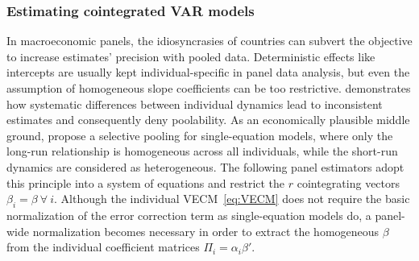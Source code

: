 \subsubsection{Estimating cointegrated VAR models}
In macroeconomic panels, the idiosyncrasies of countries can subvert the objective to increase estimates' precision with pooled data. Deterministic effects like intercepts are usually kept individual-specific in panel data analysis, but even the assumption of homogeneous slope coefficients can be too restrictive. \citet{PesaranSmith1995} demonstrates how systematic differences between individual dynamics lead to inconsistent estimates and consequently deny poolability. As an economically plausible middle ground, \citet{PesaranEtAl1999} propose a selective pooling for single-equation models, where only the long-run relationship is homogeneous across all individuals, while the short-run dynamics are considered as heterogeneous. The following panel estimators adopt this principle into a system of equations and restrict the $ r $ cointegrating vectors $ \beta_i = \beta \ \forall \ i $. Although the individual VECM~\eqref{eq:VECM} does not require the basic normalization of the error correction term as single-equation models do, a panel-wide normalization becomes necessary in order to extract the homogeneous $ \beta $ from the individual coefficient matrices $ \Pi_i = \alpha_i \beta' $.


